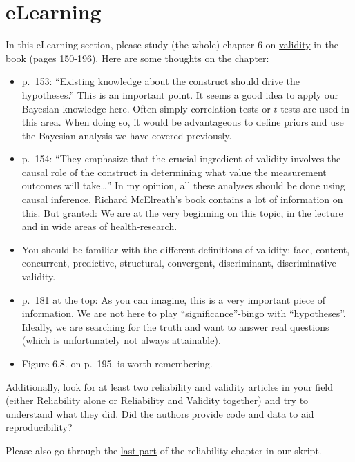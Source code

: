 \documentclass[
]{book}
\providecommand{\tightlist}{%
  \setlength{\itemsep}{0pt}\setlength{\parskip}{0pt}}
\begin{document}
\section{eLearning}\label{elearning}

In this eLearning section, please study (the whole) chapter 6 on
\href{https://en.wikipedia.org/wiki/Validity_(statistics)}{validity} in the book (pages 150-196).
Here are some thoughts on the chapter:

\begin{itemize}
\tightlist
\item
  p.~153: ``Existing knowledge about the construct should drive the hypotheses.''
  This is an important point. It seems a good idea to apply our Bayesian knowledge
  here. Often simply correlation tests or \(t\)-tests are used in this area.
  When doing so, it would be advantageous to define priors and use the Bayesian
  analysis we have covered previously.
\item
  p.~154: ``They emphasize that the crucial ingredient of validity involves the
  causal role of the construct in determining what value the measurement
  outcomes will take\ldots{}'' In my opinion, all these analyses should be done using
  causal inference. Richard McElreath's book contains a lot of information on this.
  But granted: We are at the very beginning on this topic, in the lecture and in wide
  areas of health-research.
\item
  You should be familiar with the different definitions of validity:
  face, content, concurrent, predictive, structural, convergent, discriminant,
  discriminative validity.
\item
  p.~181 at the top: As you can imagine, this is a very important piece of information.
  We are not here to play ``significance''-bingo with ``hypotheses''. Ideally,
  we are searching for the truth and want to answer real questions
  (which is unfortunately not always attainable).
\item
  Figure 6.8. on p.~195. is worth remembering.
\end{itemize}

Additionally, look for at least two reliability and validity articles in your field
(either Reliability alone or Reliability and Validity together) and try to understand what
they did. Did the authors provide code and data to aid reproducibility?

Please also go through the \href{https://jdegenfellner.github.io/Script_QM3_ZHAW/reliability-and-validity.html\#example_RELStudy}{last part}
of the reliability chapter in our skript.
\end{document}
